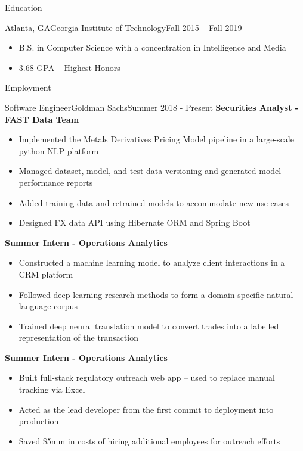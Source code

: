 \documentclass[]{mcdowellcv}
\begin{document}
	\makeheader
	
	\begin{cvsection}{Education}
		\begin{cvsubsection}{Atlanta, GA}{Georgia Institute of Technology}{Fall 2015 -- Fall 2019}
			\begin{itemize}
				\item B.S. in Computer Science with a concentration in Intelligence and Media
				\item 3.68 GPA -- Highest Honors
			\end{itemize}
		\end{cvsubsection}
	\end{cvsection}
	
	\begin{cvsection}{Employment}
		\begin{cvsubsection}{Software Engineer}{Goldman Sachs}{Summer 2018 - Present}
			\textbf{Securities Analyst - FAST Data Team}		
			\begin{itemize}
				\item Implemented the Metals Derivatives Pricing Model pipeline in a large-scale python NLP platform
				\item Managed dataset, model, and test data versioning and generated model performance reports
				\item Added training data and retrained models to accommodate new use cases
				\item Designed FX data API using Hibernate ORM and Spring Boot
			\end{itemize}
			\textbf{Summer Intern - Operations Analytics}
			\begin{itemize}
				\item Constructed a machine learning model to analyze client interactions in a CRM platform
				\item Followed deep learning research methods to form a domain specific natural language corpus
				\item Trained deep neural translation model to convert trades into a labelled representation of the transaction
			\end{itemize}
			\textbf{Summer Intern - Operations Analytics}
			\begin{itemize}
				\item Built full-stack regulatory outreach web app – used to replace manual tracking via Excel
				\item Acted as the lead developer from the first commit to deployment into production
				\item Saved \$5mm in costs of hiring additional employees for outreach efforts
			\end{itemize}
		\end{cvsubsection}
		

\end{cvsection}
\end{document}
